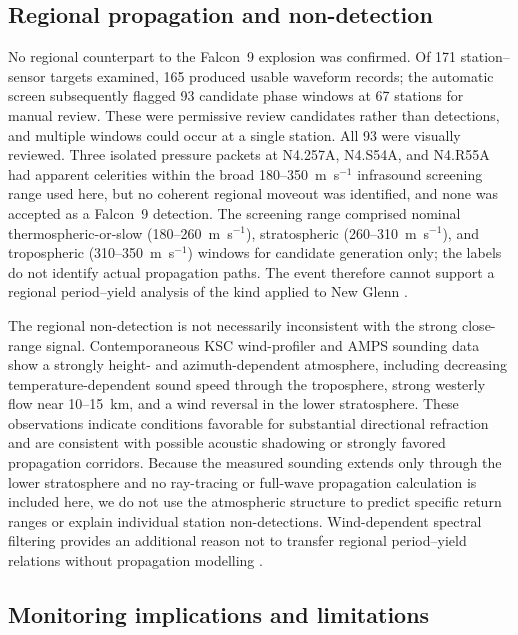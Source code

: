 \documentclass[]{seismica}
\begin{document}
\subsection{Regional propagation and non-detection}

No regional counterpart to the Falcon~9 explosion was confirmed. Of 171
station--sensor targets examined, 165 produced usable waveform records; the
automatic screen subsequently flagged 93 candidate phase windows at 67
stations for manual review. These were permissive review candidates rather
than detections, and multiple windows could occur at a single station. All 93
were visually reviewed. Three isolated pressure packets at N4.257A, N4.S54A,
and N4.R55A had apparent celerities within the broad 180--350~m~s$^{-1}$
infrasound screening range used here, but no coherent regional moveout was
identified, and none was accepted as a Falcon~9 detection. The screening
range comprised nominal thermospheric-or-slow (180--260~m~s$^{-1}$),
stratospheric (260--310~m~s$^{-1}$), and tropospheric
(310--350~m~s$^{-1}$) windows for candidate generation only; the labels do
not identify actual propagation paths. The event therefore cannot support a regional
period--yield analysis of the kind applied to New Glenn
\citep{silber_scamfer_newglenn_2026}.

The regional non-detection is not necessarily inconsistent with the strong
close-range signal. Contemporaneous KSC wind-profiler and AMPS sounding data
show a strongly height- and azimuth-dependent atmosphere, including decreasing
temperature-dependent sound speed through the troposphere, strong westerly
flow near 10--15~km, and a wind reversal in the lower stratosphere. These
observations indicate conditions favorable for substantial directional
refraction and are consistent with possible acoustic shadowing or strongly
favored propagation corridors. Because the measured sounding extends only
through the lower stratosphere and no ray-tracing or full-wave propagation
calculation is included here, we do not use the atmospheric structure to
predict specific return ranges or explain individual station
non-detections. Wind-dependent spectral filtering provides an additional
reason not to transfer regional period--yield relations without propagation
modelling \citep{silber_wind_filtering_2026}.

\subsection{Monitoring implications and limitations}
\end{document}
